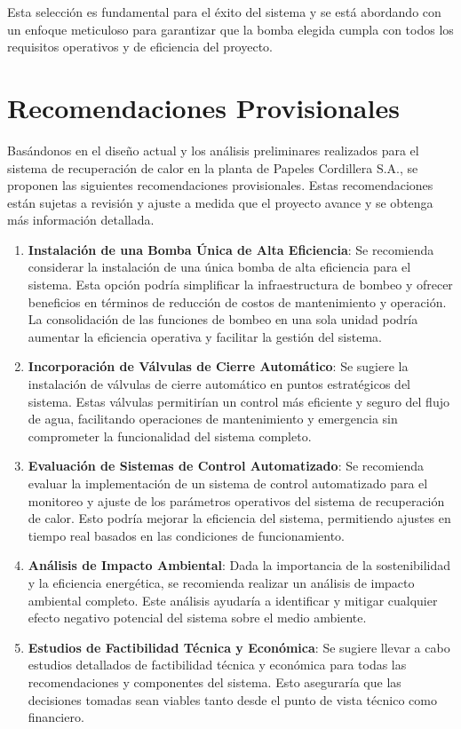 \documentclass[11pt,a4paper]{article}  %
\begin{document}
Esta selección es fundamental para el éxito del sistema y se está abordando con un enfoque meticuloso para garantizar que la bomba elegida cumpla con todos los requisitos operativos y de eficiencia del proyecto.

\section{Recomendaciones Provisionales}

Basándonos en el diseño actual y los análisis preliminares realizados para el sistema de recuperación de calor en la planta de Papeles Cordillera S.A., se proponen las siguientes recomendaciones provisionales. Estas recomendaciones están sujetas a revisión y ajuste a medida que el proyecto avance y se obtenga más información detallada.

\begin{enumerate}
    \item \textbf{Instalación de una Bomba Única de Alta Eficiencia}: Se recomienda considerar la instalación de una única bomba de alta eficiencia para el sistema. Esta opción podría simplificar la infraestructura de bombeo y ofrecer beneficios en términos de reducción de costos de mantenimiento y operación. La consolidación de las funciones de bombeo en una sola unidad podría aumentar la eficiencia operativa y facilitar la gestión del sistema.

    \item \textbf{Incorporación de Válvulas de Cierre Automático}: Se sugiere la instalación de válvulas de cierre automático en puntos estratégicos del sistema. Estas válvulas permitirían un control más eficiente y seguro del flujo de agua, facilitando operaciones de mantenimiento y emergencia sin comprometer la funcionalidad del sistema completo.

    \item \textbf{Evaluación de Sistemas de Control Automatizado}: Se recomienda evaluar la implementación de un sistema de control automatizado para el monitoreo y ajuste de los parámetros operativos del sistema de recuperación de calor. Esto podría mejorar la eficiencia del sistema, permitiendo ajustes en tiempo real basados en las condiciones de funcionamiento.

    \item \textbf{Análisis de Impacto Ambiental}: Dada la importancia de la sostenibilidad y la eficiencia energética, se recomienda realizar un análisis de impacto ambiental completo. Este análisis ayudaría a identificar y mitigar cualquier efecto negativo potencial del sistema sobre el medio ambiente.

    \item \textbf{Estudios de Factibilidad Técnica y Económica}: Se sugiere llevar a cabo estudios detallados de factibilidad técnica y económica para todas las recomendaciones y componentes del sistema. Esto aseguraría que las decisiones tomadas sean viables tanto desde el punto de vista técnico como financiero.
\end{enumerate}
\end{document}
